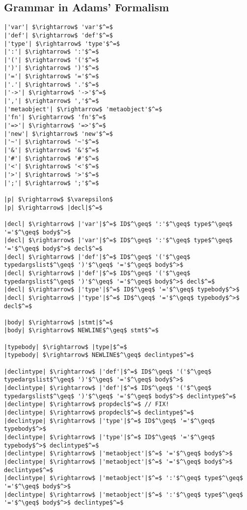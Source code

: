 \subsection{Grammar in Adams' Formalism}

\begin{lstlisting}[mathescape]
|'var'| $\rightarrow$ 'var'$^=$
|'def'| $\rightarrow$ 'def'$^=$
|'type'| $\rightarrow$ 'type'$^=$
|':'| $\rightarrow$ ':'$^=$
|'('| $\rightarrow$ '('$^=$
|')'| $\rightarrow$ ')'$^=$
|'='| $\rightarrow$ '='$^=$
|'.'| $\rightarrow$ '.'$^=$
|'->'| $\rightarrow$ '->'$^=$
|','| $\rightarrow$ ','$^=$
|'metaobject'| $\rightarrow$ 'metaobject'$^=$
|'fn'| $\rightarrow$ 'fn'$^=$
|'=>'| $\rightarrow$ '=>'$^=$
|'new'| $\rightarrow$ 'new'$^=$
|'~'| $\rightarrow$ '~'$^=$
|'&'| $\rightarrow$ '&'$^=$
|'#'| $\rightarrow$ '#'$^=$
|'<'| $\rightarrow$ '<'$^=$
|'>'| $\rightarrow$ '>'$^=$
|';'| $\rightarrow$ ';'$^=$

|p| $\rightarrow$ $\varepsilon$
|p| $\rightarrow$ |decl|$^=$

|decl| $\rightarrow$ |'var'|$^=$ ID$^\geq$ ':'$^\geq$ type$^\geq$ '='$^\geq$ body$^>$
|decl| $\rightarrow$ |'var'|$^=$ ID$^\geq$ ':'$^\geq$ type$^\geq$ '='$^\geq$ body$^>$ decl$^=$
|decl| $\rightarrow$ |'def'|$^=$ ID$^\geq$ '('$^\geq$ typedargslist$^\geq$ ')'$^\geq$ '='$^\geq$ body$^>$
|decl| $\rightarrow$ |'def'|$^=$ ID$^\geq$ '('$^\geq$ typedargslist$^\geq$ ')'$^\geq$ '='$^\geq$ body$^>$ decl$^=$
|decl| $\rightarrow$ |'type'|$^=$ ID$^\geq$ '='$^\geq$ typebody$^>$
|decl| $\rightarrow$ |'type'|$^=$ ID$^\geq$ '='$^\geq$ typebody$^>$ decl$^=$

|body| $\rightarrow$ |stmt|$^=$
|body| $\rightarrow$ NEWLINE$^\geq$ stmt$^=$

|typebody| $\rightarrow$ |type|$^=$
|typebody| $\rightarrow$ NEWLINE$^\geq$ declintype$^=$

|declintype| $\rightarrow$ |'def'|$^=$ ID$^\geq$ '('$^\geq$ typedargslist$^\geq$ ')'$^\geq$ '='$^\geq$ body$^>$
|declintype| $\rightarrow$ |'def'|$^=$ ID$^\geq$ '('$^\geq$ typedargslist$^\geq$ ')'$^\geq$ '='$^\geq$ body$^>$ declintype$^=$
|declintype| $\rightarrow$ propdecl$^=$ // FIX!
|declintype| $\rightarrow$ propdecl$^=$ declintype$^=$
|declintype| $\rightarrow$ |'type'|$^=$ ID$^\geq$ '='$^\geq$ typebody$^>$
|declintype| $\rightarrow$ |'type'|$^=$ ID$^\geq$ '='$^\geq$ typebody$^>$ declintype$^=$
|declintype| $\rightarrow$ |'metaobject'|$^=$ '='$^\geq$ body$^>$
|declintype| $\rightarrow$ |'metaobject'|$^=$ '='$^\geq$ body$^>$ declintype$^=$
|declintype| $\rightarrow$ |'metaobject'|$^=$ ':'$^\geq$ type$^\geq$ '='$^\geq$ body$^>$
|declintype| $\rightarrow$ |'metaobject'|$^=$ ':'$^\geq$ type$^\geq$ '='$^\geq$ body$^>$ declintype$^=$


\end{lstlisting}

